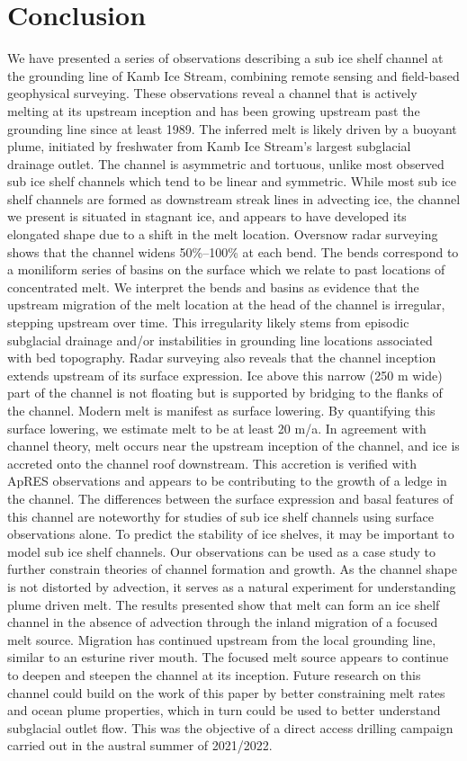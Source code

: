 \section{Conclusion} \label{sec:conclusion}
We have presented a series of observations describing a sub ice shelf channel at the grounding line of Kamb Ice Stream, combining remote sensing and field-based geophysical surveying. 
These observations reveal a channel that is actively melting at its upstream inception and has been growing upstream past the grounding line since at least 1989.
The inferred melt is likely driven by a buoyant plume, initiated by freshwater from Kamb Ice Stream's largest subglacial drainage outlet.
The channel is asymmetric and tortuous, unlike most observed sub ice shelf channels which tend to be linear and symmetric. While most sub ice shelf channels are formed as downstream streak lines in advecting ice, the channel we present is situated in stagnant ice, and appears to have developed its elongated shape due to a shift in the melt location. Oversnow radar surveying shows that the channel widens 50\%--100\% at each bend. The bends correspond to a moniliform series of basins on the surface which we relate to past locations of concentrated melt. 
We interpret the bends and basins as evidence that the upstream migration of the melt location at the head of the channel is irregular, stepping upstream over time. 
This irregularity likely stems from episodic subglacial drainage and/or instabilities in grounding line locations associated with bed topography. Radar surveying also reveals that the channel inception extends upstream of its surface expression. 
Ice above this narrow (250 m wide) part of the channel is not floating but is supported by bridging to the flanks of the channel. 
Modern melt is manifest as surface lowering. By quantifying this surface lowering, we estimate melt to be at least 20 m/a. In agreement with channel theory, melt occurs near the upstream inception of the channel, and ice is accreted onto the channel roof downstream. This accretion is verified with ApRES observations and appears to be contributing to the growth of a ledge in the channel. The differences between the surface expression and basal features of this channel are noteworthy for studies of sub ice shelf channels using surface observations alone. To predict the stability of ice shelves, it may be important to model sub ice shelf channels. Our observations can be used as a case study to further constrain theories of channel formation and growth. As the channel shape is not distorted by advection, it serves as a natural experiment for understanding plume driven melt.
The results presented show that melt can form an ice shelf channel in the absence of advection through the inland migration of a focused melt source. Migration has continued upstream from the local grounding line, similar to an esturine river mouth. The focused melt source appears to continue to deepen and steepen the channel at its inception.
Future research on this channel could build on the work of this paper by better constraining melt rates and ocean plume properties, which in turn could be used to better understand subglacial outlet flow. This was the objective of a direct access drilling campaign carried out in the austral summer of 2021/2022.


